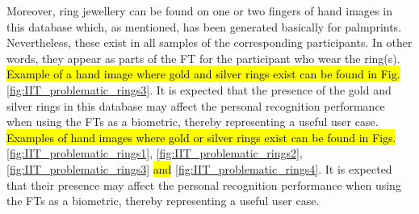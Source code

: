 \documentclass[review]{elsarticle}
\begin{document}
	Moreover, ring jewellery can be found on one or two fingers of hand images in this database which, as mentioned, has been generated basically for palmprints. Nevertheless, these exist in all samples of the corresponding participants. In other words, they appear as parts of the FT for the participant who wear the ring(s). 
	\hl{Example of a hand image where gold and silver rings exist can be found in Fig.} \ref{fig:IIT_problematic_rings3}. 
	It is expected that the presence of the gold and silver rings in this database may affect the personal recognition performance when using the FTs as a biometric, thereby representing a useful user case.
	\hl{Examples of hand images where gold or silver rings exist can be found in Figs.}     \ref{fig:IIT_problematic_rings1}, \ref{fig:IIT_problematic_rings2}, \ref{fig:IIT_problematic_rings3} \hl{and} \ref{fig:IIT_problematic_rings4}. It is expected that their presence may affect the personal recognition performance when using the FTs as a biometric, thereby representing a useful user case.
\end{document}
